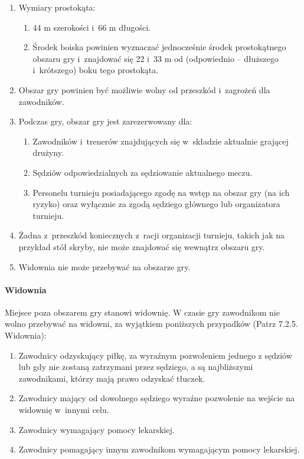 \documentclass[12pt,a4paper]{article}
\begin{document}
\begin{enumerate}
	\item Wymiary prostokąta:
	      \begin{enumerate}
		      \item 44 m szerokości i~66 m długości.
		      \item Środek boiska powinien wyznaczać jednocześnie środek prostokątnego
		            obszaru gry i~znajdować się 22 i~33 m od (odpowiednio -- dłuższego i~krótszego) boku tego prostokąta.
	      \end{enumerate}

	\item Obszar gry powinien być możliwie wolny od przeszkód i~zagrożeń dla
	      zawodników.

	\item Podczas gry, obszar gry jest zarezerwowany dla:
	      \begin{enumerate}
		      \item Zawodników i~trenerów znajdujących się w~składzie aktualnie grającej
		            drużyny.
		      \item Sędziów odpowiedzialnych za sędziowanie aktualnego meczu.
		      \item Personelu turnieju posiadającego zgodę na wstęp na obszar gry (na
		            ich ryzyko) oraz wyłącznie za zgodą sędziego głównego lub
		            organizatora turnieju.
	      \end{enumerate}

	\item Żadna z~przeszkód koniecznych z~racji organizacji turnieju, takich jak
	      na przykład stół skryby, nie może znajdować się wewnątrz obszaru gry.

	\item Widownia nie może przebywać na obszarze gry.
\end{enumerate}

\paragraph{Widownia}
Miejsce poza obszarem gry stanowi widownię.
W czasie gry zawodnikom nie wolno przebywać na widowni, za wyjątkiem
poniższych przypadków (Patrz 7.2.5. Widownia):

\begin{enumerate}
	\item Zawodnicy odzyskujący piłkę, za wyraźnym pozwoleniem jednego z sędziów lub gdy nie zostaną zatrzymani przez sędziego, a są najbliższymi zawodnikami, którzy mają prawo odzyskać tłuczek.

	\item Zawodnicy mający od dowolnego sędziego wyraźne pozwolenie na wejście
	      na widownię w~innymi celu.

	\item Zawodnicy wymagający pomocy lekarskiej.

	\item Zawodnicy pomagający innym zawodnikom wymagającym pomocy lekarskiej.
\end{enumerate}
\end{document}
